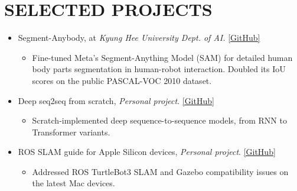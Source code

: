 \documentclass[a4paper,10pt]{extarticle}
\begin{document}
\setlength{\itemsep}{10pt} %
\section*{SELECTED PROJECTS}
\begin{itemize}
	\item Segment-Anybody, at \textit{Kyung Hee University Dept. of AI.} \href{https://github.com/leehyeonbeen/segment-anything-fine-tuning}{\color{blue}[GitHub]}

	      {\small
		      \vspace*{-0.2cm}
		      \begin{itemize}
			      \item Fine-tuned Meta's Segment-Anything Model (SAM) for detailed human body parts segmentation in human-robot interaction. Doubled its IoU scores on the public PASCAL-VOC 2010 dataset.
		      \end{itemize}
		      \vspace*{-0.2cm}
	      }

	\item Deep seq2seq from scratch, \textit{Personal project}. \href{https://github.com/leehyeonbeen/TimeSeriesSeq2Seq}{\color{blue}[GitHub]}

	      {\small
		      \vspace*{-0.2cm}
		      \begin{itemize}
			      \item Scratch-implemented deep sequence-to-sequence models, from RNN to Transformer variants.
		      \end{itemize}
		      \vspace*{-0.2cm}
	      }

	\item ROS SLAM guide for Apple Silicon devices, \textit{Personal project}. \href{https://github.com/leehyeonbeen/ROS-SLAM-AppleSilicon}{\color{blue}[GitHub]}

	      {\small
		      \vspace*{-0.2cm}
		      \begin{itemize}
			      \item Addressed ROS TurtleBot3 SLAM and Gazebo compatibility issues on the latest Mac devices.
		      \end{itemize}
		      \vspace*{-0.2cm}
	      }





\end{itemize}
\end{document}
